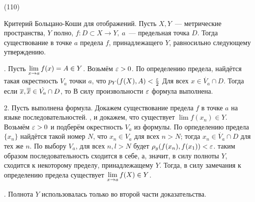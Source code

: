 (110)

\T \q Критерий Больцано-Коши для отображений. Пусть $X, Y$~--- метрические пространства, $Y$ полно, $f: D\subset X \to Y,\ a$~--- предельная точка $D$. Тогда существование в точке $a$ предела $f$, принадлежащего $Y$, равносильно следующему утверждению.

. Пусть $\displaystyle \lim\limits^{}_{x\to a}f(x) = A \in Y$. Возьмём $\varepsilon > 0$. По определению предела, найдётся такая окрестность $V_a$ точки $a$, что $p_Y(f(X), A) < \frac {\varepsilon}2$ Для всех $x \in \dot{V_a} \cap D$. Тогда если $\overline{x}, \overline{\overline{x}} \in \dot{V_a}\cap D$, то
 В силу произвольности $\varepsilon$ формула выполнена.

2. Пусть выполнена формула. Докажем существование предела $f$ в точке $a$ на языке последовательностей. \Geine, и докажем, что существует $\lim f(x_n) \in Y$. Возьмём $\varepsilon > 0$ и подберём окрестность $V_a$ из формулы. По орпеделению предела $\{x_n\}$ найдётся такой номер $N$, что $x_n \in V_a$ для всех $n > N$; тогда $x_n \in \dot{V_a}\cap D$ для тех же $n$. По выбору $V_a$, для всех $n, l > N$ будет $\rho_y(f(x_n), f(x_1)) < \varepsilon$. таким образом последовательность сходится в себе, а, значит, в силу полноты $Y$, сходится к некоторому пределу, принадлежащему $Y$. Тогда, в силу замечания к определению предела существует $\displaystyle \lim\limits^{}_{x\to a} f(X) \in Y$.

. Полнота $Y$ использовалась только во второй части доказательства.